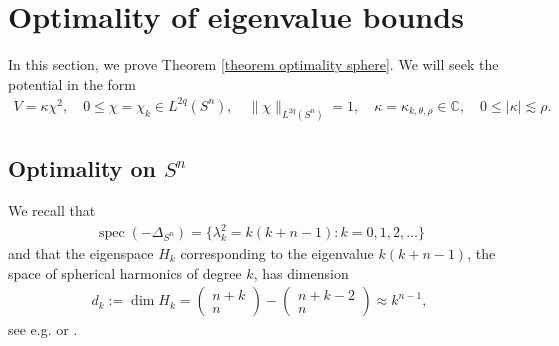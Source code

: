 \documentclass[12pt]{amsart}
\newcommand{\C}{{\mathbb C}}
\DeclareMathOperator{\spec}{spec}
\begin{document}
\section{Optimality of eigenvalue bounds}
In this section, we prove Theorem \ref{theorem optimality sphere}. We will seek the potential in the form 
\begin{align}\label{wish list chi kappa}
    V=\kappa\chi^2,\quad 0\leq \chi=\chi_k\in L^{2q}(S^n),\quad \|\chi\|_{L^{2q}(S^n)}=1,\quad \kappa=\kappa_{k,\theta,\rho}\in\C, \quad 0\leq |\kappa|\lesssim \rho.
\end{align}

\subsection{Optimality on $S^n$}
We recall that
\begin{align}
    \spec(-\Delta_{S^n})=\{\lambda_k^2=k(k+n-1):k=0,1,2,\ldots\}
\end{align}
and that the eigenspace $H_k$ corresponding to the eigenvalue $k(k+n-1)$, the space of spherical harmonics of degree $k$, has dimension 
\begin{align}
    d_k:=\dim H_k=\begin{pmatrix}
        n+k\\n
    \end{pmatrix}
    -\begin{pmatrix}
        n+k-2\\n
    \end{pmatrix}\approx k^{n-1},
\end{align}
see e.g. \cite[Section 22.3]{MR1852334} or \cite[Section 3.4]{MR3186367}. \\
\end{document}

